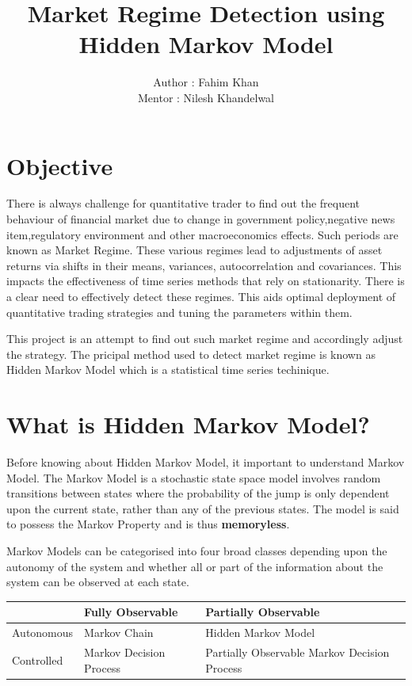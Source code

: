 \documentclass{report}
\author{Author : Fahim Khan \\
		Mentor : Nilesh Khandelwal
}
\title{Market Regime Detection using Hidden Markov Model}
\begin{document}
\maketitle
\tableofcontents



\chapter{Objective}
There is always challenge for quantitative trader to find out the frequent behaviour of financial market due to change in government policy,negative news item,regulatory environment and other macroeconomics effects. Such periods are known as Market Regime.
These various regimes lead to adjustments of asset returns via shifts in their means, variances,
autocorrelation and covariances. This impacts the effectiveness of time series methods that rely on stationarity.
There is a clear need to effectively detect these regimes. This aids optimal deployment of quantitative trading strategies and tuning the parameters within them.\par

This project is an attempt to find out such market regime and accordingly adjust the strategy. The pricipal method used to detect market regime is known as Hidden Markov Model which is a statistical time series techinique.


\chapter{What is Hidden Markov Model?}
Before knowing about Hidden Markov Model, it important to understand Markov Model. The Markov Model is a stochastic state space model involves random transitions between states where the probability of the jump is only dependent upon the current state, rather than any of the previous states. The model is said to possess the Markov Property and is thus \textbf{memoryless}.

Markov Models can be categorised into four broad classes depending upon the autonomy
of the system and whether all or part of the information about the system can be observed at
each state.

 
 

\begin{tabu} to 0.8\textwidth { | X[l] | X[c] | X[r] | }
 \hline
  & Fully Observable & Partially Observable \\
 \hline
   Autonomous & Markov Chain  & Hidden Markov Model  \\
\hline
Controlled & Markov Decision Process  & Partially Observable Markov Decision Process \\
\hline
\end{tabu}
\end{document}
